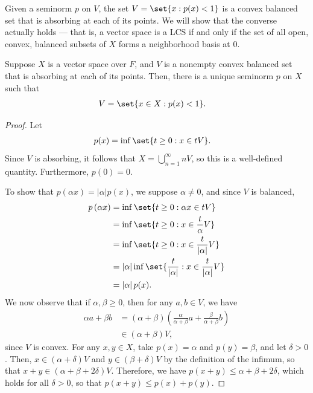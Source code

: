 \documentclass[10pt]{mypackage}
\begin{document}
Given a seminorm $p$ on $V$, the set $V = \set{x : p(x) < 1}$ is a convex balanced set that is absorbing at each of its points. We will show that the converse actually holds --- that is, a vector space is a LCS if and only if the set of all open, convex, balanced subsets of $X$ forms a neighborhood basis at $0$.
\begin{proposition}
  Suppose $X$ is a vector space over $F$, and $V$ is a nonempty convex balanced set that is absorbing at each of its points. Then, there is a unique seminorm $p$ on $X$ such that
  \begin{align*}
    V &= \set{x\in X : p(x) < 1}.
  \end{align*}
\end{proposition}
\begin{proof}
  Let
  \begin{align*}
    p(x) &= \inf \set{t\geq 0: x\in tV}.
  \end{align*}
  Since $V$ is absorbing, it follows that $X = \bigcup_{n=1}^{\infty}nV$, so this is a well-defined quantity. Furthermore, $p(0) = 0$.

  To show that $p\left( \alpha x \right) = \left\vert \alpha \right\vert p(x)$, we suppose $\alpha\neq 0$, and since $V$ is balanced,
  \begin{align*}
    p\left( \alpha x \right) &= \inf\set{t\geq 0 : \alpha x\in tV}\\
                             &= \inf\set{t \geq 0 : x\in \frac{t}{\alpha}V}\\
                             &= \inf\set{t\geq 0 : x\in \frac{t}{\left\vert \alpha \right\vert}V}\\
                             &= \left\vert \alpha \right\vert\inf\set{\frac{t}{\left\vert \alpha \right\vert} : x\in \frac{t}{\left\vert \alpha \right\vert}V}\\
                             &= \left\vert \alpha \right\vert p(x).
  \end{align*}
  We now observe that if $\alpha,\beta\geq 0$, then for any $a,b\in V$, we have
  \begin{align*}
    \alpha a + \beta b &= \left( \alpha + \beta \right) \left( \frac{\alpha}{\alpha + \beta}a + \frac{\beta}{\alpha + \beta}b \right)\\
                       &\in \left( \alpha + \beta \right)V,
  \end{align*}
  since $V$ is convex. For any $x,y\in X$, take $p(x) = \alpha$ and $p(y) = \beta$, and let $\delta > 0$. Then, $x\in \left( \alpha + \delta \right)V$ and $y\in \left( \beta + \delta \right)V$ by the definition of the infimum, so that $x + y\in \left( \alpha + \beta + 2\delta \right)V$. Therefore, we have $p\left( x + y \right)\leq \alpha + \beta + 2\delta$, which holds for all $\delta > 0$, so that $p\left( x + y \right)\leq p(x) + p(y)$.


\end{proof}
\end{document}
